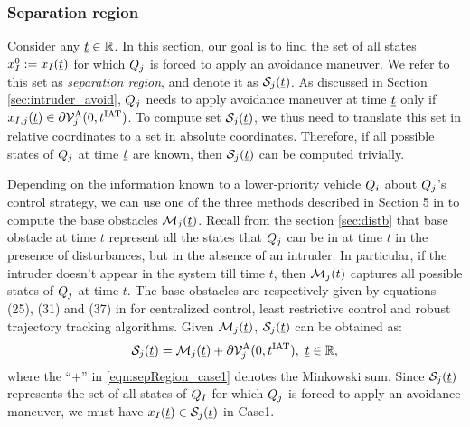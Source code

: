 \subsubsection{Separation region} \label{sec:sepRegion_case1}
Consider any $\underline{t} \in \mathbb{R}$. In this section, our goal is to find the set of all states $x_{I}^0 := x_{I}(\underline{t})$ for which $Q_j$ is forced to apply an avoidance maneuver. We refer to this set as \textit{separation region}, and denote it as $\mathcal{S}_j(\underline{t})$. As discussed in Section \ref{sec:intruder_avoid}, $Q_j$ needs to apply avoidance maneuver at time $\underline{t}$ only if $x_{I, j}(\underline{t}) \in \partial \mathcal{V}^{\text{A}}_{j}(0, t^\text{IAT})$. To compute set $\mathcal{S}_j(\underline{t})$, we thus need to translate this set in relative coordinates to a set in absolute coordinates. Therefore, if all possible states of $Q_j$ at time $\underline{t}$ are known, then $\mathcal{S}_j(\underline{t})$ can be computed trivially.

Depending on the information known to a lower-priority vehicle $Q_i$ about $Q_j$'s control strategy, we can use one of the three methods described in Section 5 in \cite{chen2016robust} to compute the base obstacles $\mathcal{M}_j(\underline{t})$. Recall from the section \ref{sec:distb} that base obstacle at time $t$ represent all the states that $Q_j$ can be in at time $t$ in the presence of disturbances, but in the absence of an intruder. In particular, if the intruder doesn't appear in the system till time $t$, then  $\mathcal{M}_j(t)$ captures all possible states of $Q_j$ at time $t$. The base obstacles are respectively given by equations (25), (31) and (37) in \cite{chen2016robust} for centralized control, least restrictive control and robust trajectory tracking algorithms. Given $\mathcal{M}_j(\underline{t})$, $\mathcal{S}_j(\underline{t})$ can be obtained as:
\begin{equation} \label{eqn:sepRegion_case1}
\sep_j(\tsa) = \boset_j(\tsa) + \partial \brs^{\text{A}}_{j}(0, \iat), ~\tsa \in \R,
\end{equation}
where the ``$+$'' in \eqref{eqn:sepRegion_case1} denotes the Minkowski sum. Since $\mathcal{S}_j(\underline{t})$ represents the set of all states of $Q_I$ for which $Q_j$ is forced to apply an avoidance maneuver, we must have $x_{I}(\underline{t}) \in \mathcal{S}_j(\underline{t})$ in Case1.
